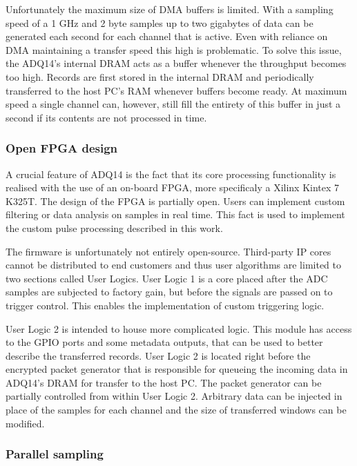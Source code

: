 Unfortunately the maximum size of DMA buffers is limited. 
With a sampling speed of a 1 GHz and 2 byte samples up 
to two gigabytes of data can be generated each second for each
channel that is active. Even with reliance on DMA maintaining 
a transfer speed this high is problematic. To solve this issue, 
the ADQ14's internal DRAM acts as a buffer 
whenever the throughput becomes too high.
Records are first stored in the internal DRAM and periodically
transferred to the host PC's RAM whenever buffers become ready.
At maximum speed a single channel can, however, still fill the entirety
of this buffer in just a second if its contents are not processed in time.

\subsubsection{Open FPGA design} \label{ssec:adq_devkit}

A crucial feature of ADQ14 is the fact that its core processing
functionality is realised with the use of an on-board FPGA,
more specificaly a Xilinx Kintex 7 K325T. The design of the FPGA
is partially open. Users can implement custom
filtering or data analysis on samples in real time.
This fact is used to implement the custom pulse processing described in this work.


The firmware is unfortunately not entirely open-source.
Third-party IP cores cannot be distributed to end customers 
and thus user algorithms are limited to two sections called User Logics.
User Logic 1 is a core placed after the ADC samples are subjected to factory
gain, but before the signals are passed on to trigger control.
This enables the implementation of custom triggering logic.


User Logic 2 is intended to house more complicated logic.
This module has access to the GPIO ports and some metadata
outputs, that can be used to better describe the transferred records.
User Logic 2 is located right before the encrypted packet generator
that is responsible for queueing the incoming data in ADQ14's DRAM 
for transfer to the host PC. The packet generator can be partially
controlled from within User Logic 2. Arbitrary data can be injected
in place of the samples for each channel and the size of transferred windows 
can be modified.

\subsubsection{Parallel sampling} \label{sssec:parallel_sampling}

